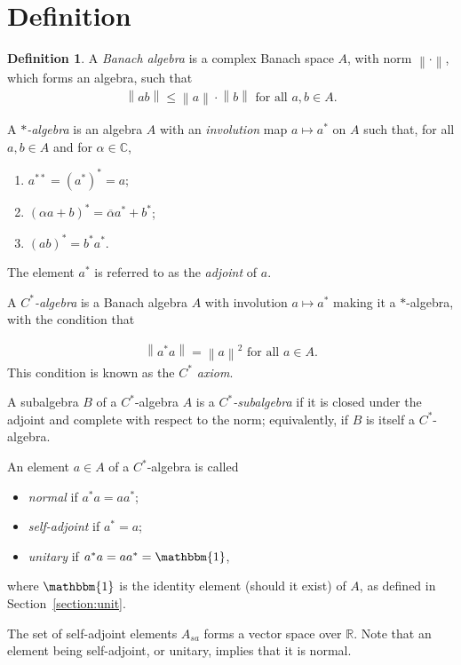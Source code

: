 \documentclass[11pt,a4paper]{report}
\theoremstyle{plain}
\theoremstyle{definition}
\newtheorem{defn}{Definition}
\newcommand{\1}{\mathbbm{1}}
\newcommand{\C}{\mathbb{C}}
\newcommand{\R}{\mathbb{R}}
\begin{document}
\section{Definition}
\begin{defn}
	A \emph{Banach algebra} is a complex Banach space $A$, with norm 
	$\left\|\cdot\right\|$, which forms an algebra, such that 
	\begin{align*}
		\left\|ab\right\| \leq 
				\left\|a\right\| \cdot \left\|b\right\| \mbox{ for all } a,b \in A.
	\end{align*}
	
	A \emph{$\ast$-algebra} is an algebra $A$ with an \emph{involution} map 
	$a \mapsto a^\ast$ on $A$ such that, for all $a,b \in A$ and for $\alpha \in \C$,
	\begin{enumerate}
		\item $a^{\ast\ast} = (a^\ast)^\ast = a$;
		\item $(\alpha a+b)^\ast = \overline{\alpha} a^\ast + b^\ast$;
		\item $(ab)^\ast = b^\ast a^\ast$.
	\end{enumerate}
	The element $a^\ast$ is referred to as the \emph{adjoint} of $a$. 
	
	A \emph{$C^\ast$-algebra} is a Banach algebra $A$ with involution $a \mapsto 
	a^\ast$ making it a $\ast$-algebra, with the condition that

	\begin{align*}
		\left\|a ^\ast a\right\| = \left\|a\right\|^2 \mbox{ for all } a \in A.
	\end{align*}
	This condition is known as the \emph{$C^\ast$ axiom}.
	
	A subalgebra $B$ of a $C^\ast$-algebra $A$ is a \emph{$C^\ast$-subalgebra} if it 
	is closed under the adjoint and complete with respect to the norm; equivalently, 
	if $B$ is itself a $C^\ast$-algebra.

	
	An element $a\in A$ of a $C^\ast$-algebra is called
	\begin{itemize}
		\item	\emph{normal} if $a^\ast a=aa^\ast$;
		\item 	\emph{self-adjoint} if $a^\ast=a$;
		\item 	\emph{unitary} if $a^\ast a = aa^\ast =\1$,
	\end{itemize}
	where $\1$ is the identity element (should it exist) of $A$, as defined in 
	Section~\ref{section:unit}. 
\end{defn}
The set of self-adjoint elements $A_{sa}$ forms a vector space over $\R$. Note 
that an element being self-adjoint, or unitary, implies that it is normal.
\end{document}
